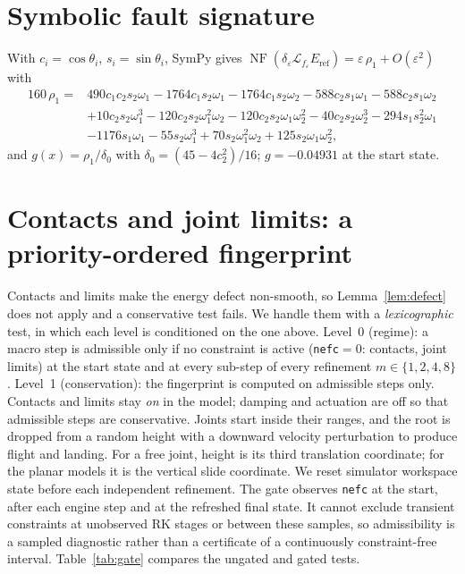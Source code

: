 \documentclass[10pt]{article}
\theoremstyle{definition}
\DeclareMathOperator{\NF}{NF}
\newcommand{\Lie}{\mathcal{L}}
\newcommand{\Eref}{E_{\mathrm{ref}}}
\begin{document}
\FloatBarrier
\appendix
\section{Symbolic fault signature}\label{app:sig}

With $c_i=\cos\theta_i$, $s_i=\sin\theta_i$, SymPy gives
$\NF(\delta_\varepsilon\Lie_{f_\varepsilon}\Eref)=\varepsilon\,\rho_1+O(\varepsilon^2)$ with
\begin{equation*}
\begin{aligned}
160\,\rho_1={}&490c_1c_2s_2\omega_1-1764c_1s_2\omega_1-1764c_1s_2\omega_2
-588c_2s_1\omega_1-588c_2s_1\omega_2\\
&+10c_2s_2\omega_1^3-120c_2s_2\omega_1^2\omega_2-120c_2s_2\omega_1\omega_2^2
-40c_2s_2\omega_2^3-294s_1s_2^2\omega_1\\
&-1176s_1\omega_1-55s_2\omega_1^3+70s_2\omega_1^2\omega_2+125s_2\omega_1\omega_2^2 ,
\end{aligned}
\end{equation*}
and $g(x)=\rho_1/\delta_0$ with $\delta_0=(45-4c_2^2)/16$; $g=-0.04931$ at the
start state.

\section{Contacts and joint limits: a priority-ordered fingerprint}\label{sec:audit:gate}

Contacts and limits make the energy defect non-smooth, so Lemma~\ref{lem:defect}
does not apply and a conservative test fails. We handle them with a
\emph{lexicographic} test, in which each level is conditioned on the one above.
Level~0 (regime): a macro step is admissible only if no constraint is active
(\texttt{nefc}$=0$: contacts, joint limits) at the start state and at every
sub-step of every refinement $m\in\{1,2,4,8\}$. Level~1 (conservation): the
fingerprint is computed on admissible steps only. Contacts and limits stay
\emph{on} in the model; damping and actuation are off so that admissible steps
are conservative. Joints start inside their ranges, and the root is dropped from
a random height with a downward velocity perturbation to produce flight
and landing. For a free joint, height is its third translation coordinate;
for the planar models it is the vertical slide coordinate. We reset simulator
workspace state before each independent refinement. The gate observes
\texttt{nefc} at the start, after each engine step and at the refreshed final
state. It cannot exclude transient constraints at unobserved RK stages or
between these samples, so admissibility is a sampled diagnostic rather than
a certificate of a continuously constraint-free interval. Table~\ref{tab:gate}
compares the ungated and gated tests.
\end{document}
